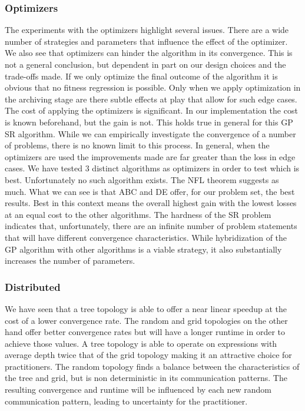 \subsubsection{Optimizers}
The experiments with the optimizers highlight several issues. There are a wide number of strategies and parameters that influence the effect of the optimizer. We also see that optimizers can hinder the algorithm in its convergence. This is not a general conclusion, but dependent in part on our design choices and the trade-offs made. If we only optimize the final outcome of the algorithm it is obvious that no fitness regression is possible. Only when we apply optimization in the archiving stage are there subtle effects at play that allow for such edge cases. The cost of applying the optimizers is significant. In our implementation the cost is known beforehand, but the gain is not. This holds true in general for this GP SR algorithm. While we can empirically investigate the convergence of a number of problems, there is no known limit to this process. 
In general, when the optimizers are used the improvements made are far greater than the loss in edge cases. We have tested 3 distinct algorithms as optimizers in order to test which is best. Unfortunately no such algorithm exists. The NFL theorem \cite{NFL} suggests as much. What we can see is that ABC and DE offer, for our problem set, the best results. Best in this context means the overall highest gain with the lowest losses at an equal cost to the other algorithms. The hardness of the SR problem indicates that, unfortunately, there are an infinite number of problem statements that will have different convergence characteristics. While hybridization of the GP algorithm with other algorithms is a viable strategy, it also substantially increases the number of parameters. 
\subsubsection{Distributed}
We have seen that a tree topology is able to offer a near linear speedup at the cost of a lower convergence rate. The random and grid topologies on the other hand offer better convergence rates but will have a longer runtime in order to achieve those values. A tree topology is able to operate on expressions with average depth twice that of the grid topology making it an attractive choice for practitioners. The random topology finds a balance between the characteristics of the tree and grid, but is non deterministic in its communication patterns. The resulting convergence and runtime will be influenced by each new random communication pattern, leading to uncertainty for the practitioner.